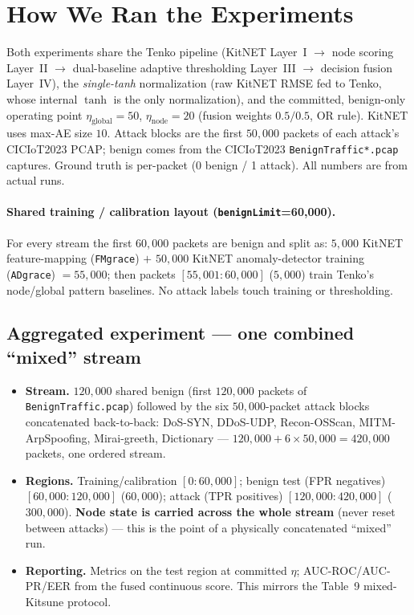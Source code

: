 \documentclass[10pt]{article}
\begin{document}
\section{How We Ran the Experiments}
\label{sec:ourexp}

Both experiments share the Tenko pipeline (KitNET Layer~I $\rightarrow$ node scoring Layer~II
$\rightarrow$ dual-baseline adaptive thresholding Layer~III $\rightarrow$ decision fusion
Layer~IV), the \emph{single-tanh} normalization (raw KitNET RMSE fed to Tenko, whose internal
$\tanh$ is the only normalization), and the committed, benign-only operating point
$\eta_{\mathrm{global}}{=}50$, $\eta_{\mathrm{node}}{=}20$ (fusion weights $0.5/0.5$, OR rule).
KitNET uses max-AE size $10$. Attack blocks are the first $50{,}000$ packets of each attack's
CICIoT2023 PCAP; benign comes from the CICIoT2023 \texttt{BenignTraffic*.pcap} captures.
Ground truth is per-packet (0 benign / 1 attack). All numbers are from actual runs.

\paragraph{Shared training / calibration layout (\texttt{benignLimit}=60{,}000).}
For every stream the first $60{,}000$ packets are benign and split as:
$5{,}000$ KitNET feature-mapping (\texttt{FMgrace}) $+$ $50{,}000$ KitNET anomaly-detector
training (\texttt{ADgrace}) $=55{,}000$; then packets $[55{,}001{:}60{,}000]$ ($5{,}000$)
train Tenko's node/global pattern baselines. No attack labels touch training or thresholding.

\subsection{Aggregated experiment --- one combined ``mixed'' stream}
\begin{itemize}
\item \textbf{Stream.} $120{,}000$ shared benign (first $120{,}000$ packets of
\texttt{BenignTraffic.pcap}) followed by the six $50{,}000$-packet attack blocks concatenated
back-to-back: DoS-SYN, DDoS-UDP, Recon-OSScan, MITM-ArpSpoofing, Mirai-greeth, Dictionary ---
$120{,}000 + 6{\times}50{,}000 = 420{,}000$ packets, one ordered stream.
\item \textbf{Regions.} Training/calibration $[0{:}60{,}000]$; benign test (FPR negatives)
$[60{,}000{:}120{,}000]$ ($60{,}000$); attack (TPR positives) $[120{,}000{:}420{,}000]$
($300{,}000$). \textbf{Node state is carried across the whole stream} (never reset between
attacks) --- this is the point of a physically concatenated ``mixed'' run.
\item \textbf{Reporting.} Metrics on the test region at committed $\eta$; AUC-ROC/AUC-PR/EER
from the fused continuous score. This mirrors the Table~9 mixed-Kitsune protocol.
\end{itemize}
\end{document}
